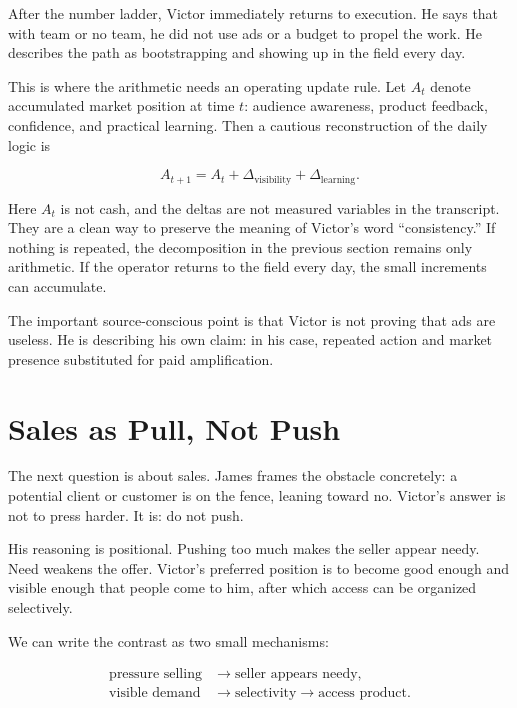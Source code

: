After the number ladder, Victor immediately returns to execution. He says that with team or no team, he did not use ads or a budget to propel the work. He describes the path as bootstrapping and showing up in the field every day.

This is where the arithmetic needs an operating update rule. Let \(A_t\) denote accumulated market position at time \(t\): audience awareness, product feedback, confidence, and practical learning. Then a cautious reconstruction of the daily logic is

\begin{equation}
A_{t+1}
=
A_t
+
\Delta_{\text{visibility}}
+
\Delta_{\text{learning}}.
\end{equation}

Here \(A_t\) is not cash, and the deltas are not measured variables in the transcript. They are a clean way to preserve the meaning of Victor's word ``consistency.'' If nothing is repeated, the decomposition in the previous section remains only arithmetic. If the operator returns to the field every day, the small increments can accumulate.

The important source-conscious point is that Victor is not proving that ads are useless. He is describing his own claim: in his case, repeated action and market presence substituted for paid amplification.

\section{Sales as Pull, Not Push}

The next question is about sales. James frames the obstacle concretely: a potential client or customer is on the fence, leaning toward no. Victor's answer is not to press harder. It is: do not push.

His reasoning is positional. Pushing too much makes the seller appear needy. Need weakens the offer. Victor's preferred position is to become good enough and visible enough that people come to him, after which access can be organized selectively.

We can write the contrast as two small mechanisms:

\begin{align}
\text{pressure selling}
&\longrightarrow
\text{seller appears needy}, \\
\text{visible demand}
&\longrightarrow
\text{selectivity}
\longrightarrow
\text{access product}.
\end{align}

